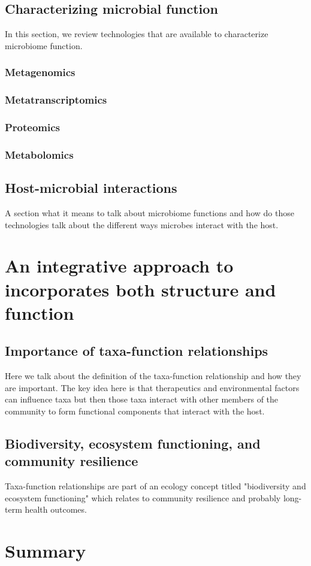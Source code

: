 \subsection{Characterizing microbial function}
In this section, we review technologies that are available to characterize microbiome function. 
\subsubsection{Metagenomics}
\subsubsection{Metatranscriptomics}
\subsubsection{Proteomics}
\subsubsection{Metabolomics}

\subsection{Host-microbial interactions}
A section what it means to talk about microbiome functions and how do those technologies talk about the different ways microbes interact with the host. 


\section{An integrative approach to incorporates both structure and function}

\subsection{Importance of taxa-function relationships}
Here we talk about the definition of the taxa-function relationship and how they are important. The key idea here is that therapeutics and environmental factors can influence taxa but then those taxa interact with other members of the community to form functional components that interact with the host. 


\subsection{Biodiversity, ecosystem functioning, and community resilience}
Taxa-function relationships are part of an ecology concept titled "biodiversity and ecosystem functioning" which relates to community resilience and probably long-term health outcomes. 


\section{Summary}
